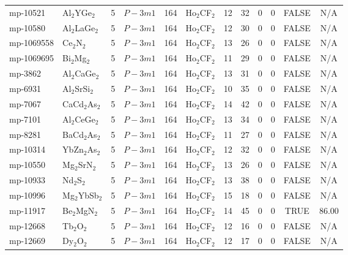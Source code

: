 {\begin{longtable}{llcccccccccc}
    mp-10521 & Al$_{2}$YGe$_{2}$ & 5     & $P-3m1$ & 164   & Ho$_{2}$CF$_{2}$ & 12    & 32    & 0     & 0     & FALSE & N/A \\
    mp-10580 & Al$_{2}$LaGe$_{2}$ & 5     & $P-3m1$ & 164   & Ho$_{2}$CF$_{2}$ & 12    & 30    & 0     & 0     & FALSE & N/A \\
    mp-1069558 & Ce$_{2}$N$_{2}$ & 5     & $P-3m1$ & 164   & Ho$_{2}$CF$_{2}$ & 13    & 26    & 0     & 0     & FALSE & N/A \\
    mp-1069695 & Bi$_{2}$Mg$_{2}$ & 5     & $P-3m1$ & 164   & Ho$_{2}$CF$_{2}$ & 11    & 29    & 0     & 0     & FALSE & N/A \\
    mp-3862 & Al$_{2}$CaGe$_{2}$ & 5     & $P-3m1$ & 164   & Ho$_{2}$CF$_{2}$ & 13    & 31    & 0     & 0     & FALSE & N/A \\
    mp-6931 & Al$_{2}$SrSi$_{2}$ & 5     & $P-3m1$ & 164   & Ho$_{2}$CF$_{2}$ & 10    & 35    & 0     & 0     & FALSE & N/A \\
    mp-7067 & CaCd$_{2}$As$_{2}$ & 5     & $P-3m1$ & 164   & Ho$_{2}$CF$_{2}$ & 14    & 42    & 0     & 0     & FALSE & N/A \\
    mp-7101 & Al$_{2}$CeGe$_{2}$ & 5     & $P-3m1$ & 164   & Ho$_{2}$CF$_{2}$ & 13    & 34    & 0     & 0     & FALSE & N/A \\
    mp-8281 & BaCd$_{2}$As$_{2}$ & 5     & $P-3m1$ & 164   & Ho$_{2}$CF$_{2}$ & 11    & 27    & 0     & 0     & FALSE & N/A \\
    mp-10314 & YbZn$_{2}$As$_{2}$ & 5     & $P-3m1$ & 164   & Ho$_{2}$CF$_{2}$ & 12    & 32    & 0     & 0     & FALSE & N/A \\
    mp-10550 & Mg$_{2}$SrN$_{2}$ & 5     & $P-3m1$ & 164   & Ho$_{2}$CF$_{2}$ & 13    & 26    & 0     & 0     & FALSE & N/A \\
    mp-10933 & Nd$_{2}$S$_{2}$ & 5     & $P-3m1$ & 164   & Ho$_{2}$CF$_{2}$ & 13    & 38    & 0     & 0     & FALSE & N/A \\
    mp-10996 & Mg$_{2}$YbSb$_{2}$ & 5     & $P-3m1$ & 164   & Ho$_{2}$CF$_{2}$ & 15    & 18    & 0     & 0     & FALSE & N/A \\
    mp-11917 & Be$_{2}$MgN$_{2}$ & 5     & $P-3m1$ & 164   & Ho$_{2}$CF$_{2}$ & 14    & 45    & 0     & 0     & TRUE  & 86.00  \\
    mp-12668 & Tb$_{2}$O$_{2}$ & 5     & $P-3m1$ & 164   & Ho$_{2}$CF$_{2}$ & 12    & 16    & 0     & 0     & FALSE & N/A \\
    mp-12669 & Dy$_{2}$O$_{2}$ & 5     & $P-3m1$ & 164   & Ho$_{2}$CF$_{2}$ & 12    & 17    & 0     & 0     & FALSE & N/A \\

\end{longtable}}
